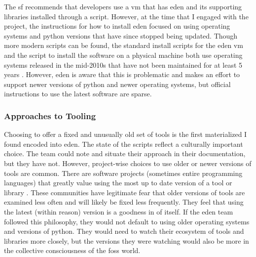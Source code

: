 \documentclass[a4paper,man,natbib,floatsintext]{apa6}
\begin{document}
   The \gls{sf} recommends that developers use a \gls{vm} that has \acrshort{eden} and its supporting libraries installed through a script. However, at the time that I engaged with the project, the instructions for how to install \acrshort{eden} focused on using operating systems and \gls{python} versions that have since stopped being updated. Though more modern scripts can be found, the standard install scripts for the \acrshort{eden} \gls{vm} and the script to install the software on a physical machine both use operating systems released in the mid-2010s that have not been maintained for at least 5 years \citep{Canonical2020-ru}. However, \acrshort{eden} is aware that this is problematic and makes an effort to support newer versions of \gls{python} and newer operating systems, but official instructions to use the latest software are sparse.


   \subsubsection{Approaches to Tooling}
   Choosing to offer a fixed and unusually old set of tools is the first materialized I found encoded into \acrshort{eden}. The state of the scripts reflect a culturally important choice. The team could note and situate their approach in their documentation, but they have not. However, project-wise choices to use older or newer versions of tools are common. There are software projects (sometimes entire programming languages) that greatly value using the most up to date version of a tool or library \citep{Fernandes_da_Costa2017-mh}. These communities have legitimate fear that older versions of tools are examined less often and will likely be fixed less frequently. They feel that using the latest (within reason) version is a goodness in of itself. If the \acrshort{eden} team followed this philosophy, they would not default to using older operating systems and versions of \gls{python}. They would need to watch their ecosystem of tools and libraries more closely, but the versions they were watching would also be more in the collective consciousness of the \acrshort{foss} world. 
\end{document}
